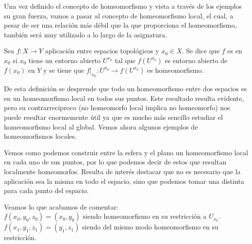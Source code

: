 Una vez definido el concepto de homeomorfismo y vista a través de los ejemplos su gran fuerza, vamos a pasar al concepto de homeomorfismo local, el cual, a pesar de ser una relación más débil que la que proporciona el homeomorfismo, también será muy utilizado a lo largo de la asignatura.

\label{cont_def_homeomorfismoLocal}
\begin{defi}
	Sea $f:X\rightarrow Y$ aplicación entre espacios topológicos y $x_0\in X$. Se dice que $f$ es  en $x_0$ si $x_0$ tiene un entorno abierto $U^{x_0}$ tal que $f(U^{x_0})$ es entorno abierto de $f(x_0)$ en $Y$ y se tiene que $f|_{x_0}:U^{x_0}\rightarrow f(U^{x_0})$ es homeomorfismo.
\end{defi}

De esta definición se desprende que todo un homeomorfismo entre dos espacios es en un homeomorfismo local en todos sus puntos. Este resultado resulta evidente, pero su contrarreciproco (no homeomorfo local implica no homeomorfo) nos puede resultar enormemente útil ya que es mucho más sencillo estudiar  el homeomorfismo local al global.
Vemos ahora algunos ejemplos de homeomorfismos locales.

\label{cont_exa_homeomorfismoLocal}
\begin{exa}
	Vemos como podemos construir entre la esfera y el plano un homeomorfismo local en cada uno de sus puntos, por lo que podemos decir de estos que resultan localmente homeomorfos.
	Resulta de interés destacar que no es necesario que la aplicación sea la misma en todo el espacio, sino que podemos tomar una distinta para cada punto del espacio.
	
	Veamos lo que acabamos de comentar: \\ 
	$f(x_0,y_0,z_0)=(x_0,y_0)$ siendo homeomorfismo en su restricción a $U_{x_0}$. \\
	$f(x_1,y_1,z_1)=(y_1,z_1)$ siendo del mismo modo homeomorfismo en su restricción.
\end{exa}

